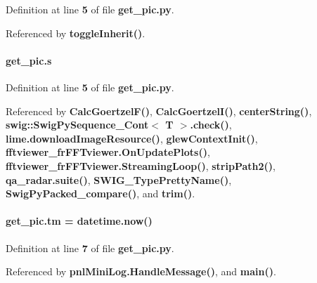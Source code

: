 Definition at line {\bf 5} of file {\bf get\+\_\+pic.\+py}.



Referenced by {\bf toggle\+Inherit()}.

\paragraph[{s}]{\setlength{\rightskip}{0pt plus 5cm}get\+\_\+pic.\+s}\label{namespaceget__pic_ab04d0a52d23fe7eb87da536e58fa3568}


Definition at line {\bf 5} of file {\bf get\+\_\+pic.\+py}.



Referenced by {\bf Calc\+Goertzel\+F()}, {\bf Calc\+Goertzel\+I()}, {\bf center\+String()}, {\bf swig\+::\+Swig\+Py\+Sequence\+\_\+\+Cont$<$ T $>$.\+check()}, {\bf lime.\+download\+Image\+Resource()}, {\bf glew\+Context\+Init()}, {\bf fftviewer\+\_\+fr\+F\+F\+Tviewer.\+On\+Update\+Plots()}, {\bf fftviewer\+\_\+fr\+F\+F\+Tviewer.\+Streaming\+Loop()}, {\bf strip\+Path2()}, {\bf qa\+\_\+radar.\+suite()}, {\bf S\+W\+I\+G\+\_\+\+Type\+Pretty\+Name()}, {\bf Swig\+Py\+Packed\+\_\+compare()}, and {\bf trim()}.

\paragraph[{tm}]{\setlength{\rightskip}{0pt plus 5cm}get\+\_\+pic.\+tm = datetime.\+now()}\label{namespaceget__pic_ab5bbb840f1825cfd81112f3730d7cb30}


Definition at line {\bf 7} of file {\bf get\+\_\+pic.\+py}.



Referenced by {\bf pnl\+Mini\+Log.\+Handle\+Message()}, and {\bf main()}.

